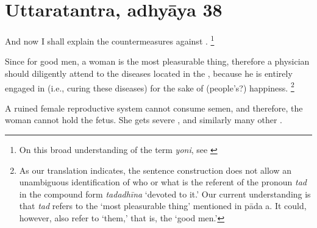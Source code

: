 
\section{Uttaratantra, adhyāya 38}

\begin{translation}

\item [1] And now I shall explain the countermeasures against .%
	\footnote{%
	On this broad understanding of the term \emph{yoni}, see \cite[pp.\ 
	572--5]{das-orig}}

\item [2] Since for good men, a woman is the most pleasurable thing, therefore a physician should diligently attend to the diseases located in the , because he is entirely engaged in (i.e., curing these diseases) for the sake of (people's?) happiness.%
	\footnote{%
	As our translation indicates, the sentence construction does not allow an 
	unambiguous identification of who or what is the referent of the pronoun 
	\textit{tad} in the compound form \emph{tadadhīna} ‘devoted to it.’ Our 
	current understanding is that \emph{tad} refers to the ‘most pleasurable thing’ 
	mentioned in pāda a. It could, however, also refer to ‘them,’ that is, the ‘good 
	men.’%
	}

\item [3] A ruined female reproductive system cannot consume semen, and therefore, the woman cannot hold the fetus. She gets severe ,  and similarly many other .



\end{translation}
